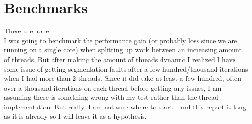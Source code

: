 \documentclass[a4paper, 12pt]{article}
\begin{document}
\section{Benchmarks}
There are none.\\
I was going to benchmark the performance gain (or probably loss since we are running on a single core) when splitting up work between an increasing amount of threads. But after making the amount of threads dynamic I realized I have some issue of getting segmentation faults after a few hundred/thousand iterations when I had more than 2 threads. Since it did take at least a few hundred, often over a thousand iterations on each thread before getting any issues, I am assuming there is something wrong with my test rather than the thread implementation. But really, I am not sure where to start - and this report is long as it is already so I will leave it as a hypothesis.


\end{document}
